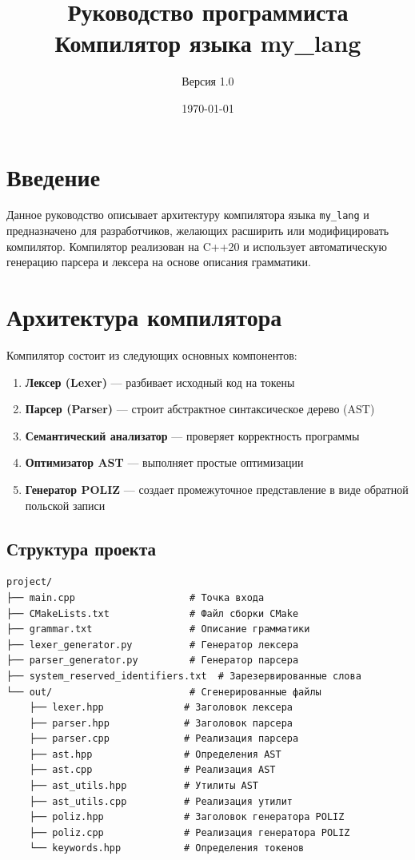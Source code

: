 \documentclass[12pt,a4paper]{article}
\title{Руководство программиста\\Компилятор языка my\_lang}
\author{Версия 1.0}
\date{\today}
\begin{document}
\maketitle
\tableofcontents
\newpage

\section{Введение}

Данное руководство описывает архитектуру компилятора языка \texttt{my\_lang} и предназначено для разработчиков, желающих расширить или модифицировать компилятор. Компилятор реализован на C++20 и использует автоматическую генерацию парсера и лексера на основе описания грамматики.

\section{Архитектура компилятора}

Компилятор состоит из следующих основных компонентов:

\begin{enumerate}
    \item \textbf{Лексер (Lexer)} --- разбивает исходный код на токены
    \item \textbf{Парсер (Parser)} --- строит абстрактное синтаксическое дерево (AST)
    \item \textbf{Семантический анализатор} --- проверяет корректность программы
    \item \textbf{Оптимизатор AST} --- выполняет простые оптимизации
    \item \textbf{Генератор POLIZ} --- создает промежуточное представление в виде обратной польской записи
\end{enumerate}

\subsection{Структура проекта}

\begin{verbatim}
project/
├── main.cpp                    # Точка входа
├── CMakeLists.txt              # Файл сборки CMake
├── grammar.txt                 # Описание грамматики
├── lexer_generator.py          # Генератор лексера
├── parser_generator.py         # Генератор парсера
├── system_reserved_identifiers.txt  # Зарезервированные слова
└── out/                        # Сгенерированные файлы
    ├── lexer.hpp              # Заголовок лексера
    ├── parser.hpp             # Заголовок парсера
    ├── parser.cpp             # Реализация парсера
    ├── ast.hpp                # Определения AST
    ├── ast.cpp                # Реализация AST
    ├── ast_utils.hpp          # Утилиты AST
    ├── ast_utils.cpp          # Реализация утилит
    ├── poliz.hpp              # Заголовок генератора POLIZ
    ├── poliz.cpp              # Реализация генератора POLIZ
    └── keywords.hpp           # Определения токенов
\end{verbatim}
\end{document}

